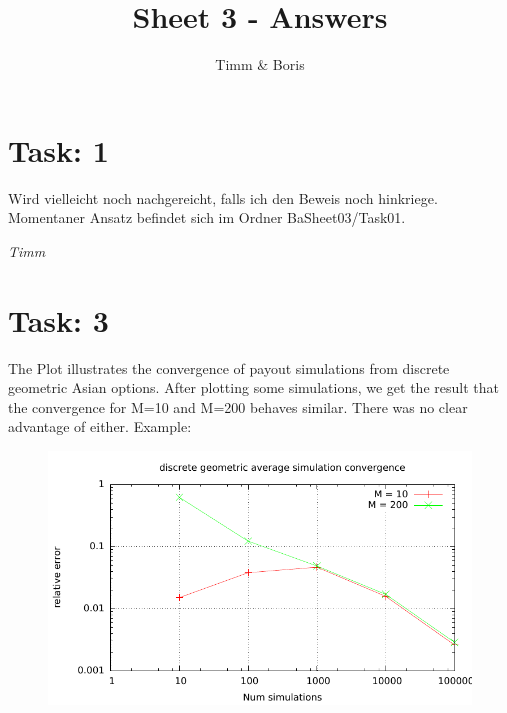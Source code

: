 \documentclass{article}
\title{Sheet 3 - Answers}
\author{Timm \& Boris}
\begin{document}
\maketitle

\section*{Task: 1}

Wird vielleicht noch nachgereicht, falls ich den Beweis noch hinkriege.\\
Momentaner Ansatz befindet sich im Ordner BaSheet03/Task01.

{\textit{Timm}}

\section*{Task: 3}
% 
The Plot illustrates the convergence of payout simulations from discrete geometric Asian options.
After plotting some simulations, we get the result that the convergence for M=10 and M=200 behaves similar. There was no clear advantage of either. Example:\\
\begin{figure}[htbp]
  \centering
     \includegraphics[width=1.0\textwidth]{../Task03/sh3_task3_convergence_plot.pdf}
\end{figure}
\newpage
\end{document}

